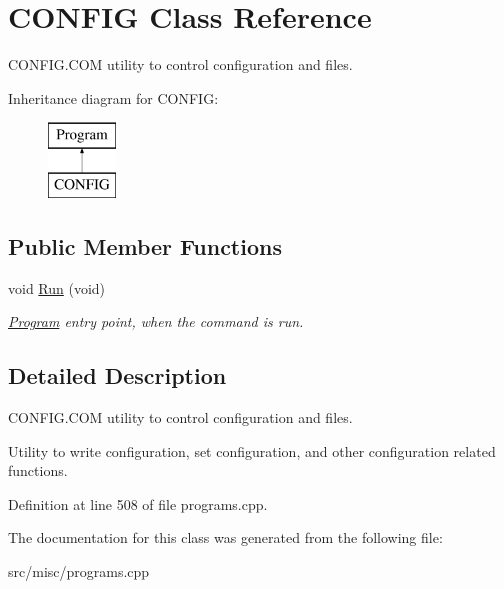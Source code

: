 \hypertarget{classCONFIG}{\section{C\-O\-N\-F\-I\-G Class Reference}
\label{classCONFIG}
}


C\-O\-N\-F\-I\-G.\-C\-O\-M utility to control configuration and files.  


Inheritance diagram for C\-O\-N\-F\-I\-G\-:\begin{figure}[H]
\begin{center}
\leavevmode
\includegraphics[height=2.000000cm]{classCONFIG}
\end{center}
\end{figure}
\subsection*{Public Member Functions}
\begin{DoxyCompactItemize}
\item 
\hypertarget{classCONFIG_a70fa41a171a274d6f1ef63cbfd2928ef}{void \hyperlink{classCONFIG_a70fa41a171a274d6f1ef63cbfd2928ef}{Run} (void)}\label{classCONFIG_a70fa41a171a274d6f1ef63cbfd2928ef}

\begin{DoxyCompactList}\small\item\em \hyperlink{classProgram}{Program} entry point, when the command is run. \end{DoxyCompactList}\end{DoxyCompactItemize}


\subsection{Detailed Description}
C\-O\-N\-F\-I\-G.\-C\-O\-M utility to control configuration and files. 

Utility to write configuration, set configuration, and other configuration related functions. 

Definition at line 508 of file programs.\-cpp.



The documentation for this class was generated from the following file\-:\begin{DoxyCompactItemize}
\item 
src/misc/programs.\-cpp\end{DoxyCompactItemize}
